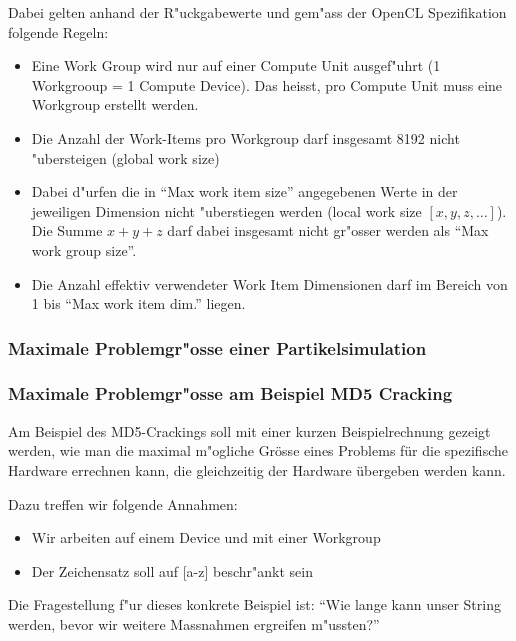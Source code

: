 \begin{refsection}
\begin{description}
\end{description}


\noindent Dabei gelten anhand der R"uckgabewerte und gem"ass der OpenCL
Spezifikation\cite{crypto:opencl_ref} folgende Regeln:

\begin{itemize}
 \item Eine Work Group wird nur auf einer Compute Unit ausgef"uhrt (1 Workgrooup = 1 
       Compute Device). Das heisst, pro Compute Unit muss eine Workgroup erstellt werden.
 \item Die Anzahl der Work-Items pro Workgroup darf insgesamt 8192 nicht "ubersteigen (global work size)
 \item Dabei d"urfen die in ``Max work item size'' angegebenen Werte in der jeweiligen 
       Dimension nicht "uberstiegen werden (local work size $[x,y,z,\ldots]$).
			 Die Summe $x + y + z$ darf dabei insgesamt nicht gr"osser werden als ``Max work group size''.
 \item Die Anzahl effektiv verwendeter Work Item Dimensionen darf im Bereich von 1 bis
       ``Max work item dim.'' liegen.
\end{itemize}


\subsubsection {Maximale Problemgr"osse einer Partikelsimulation}


\subsubsection{Maximale Problemgr"osse am Beispiel MD5 Cracking}

Am Beispiel des MD5-Crackings soll mit einer kurzen Beispielrechnung 
gezeigt werden, wie man die maximal m"ogliche Grösse eines Problems 
für die spezifische Hardware errechnen kann, die gleichzeitig der
Hardware übergeben werden kann.

Dazu treffen wir folgende Annahmen:

\begin{itemize}
 \item Wir arbeiten auf einem Device und mit einer Workgroup
 \item Der Zeichensatz soll auf [a-z] beschr"ankt sein
\end{itemize}

Die Fragestellung f"ur dieses konkrete Beispiel ist: ``Wie 
lange kann unser String werden, bevor wir weitere Massnahmen
ergreifen m"ussten?''


\end{refsection}
